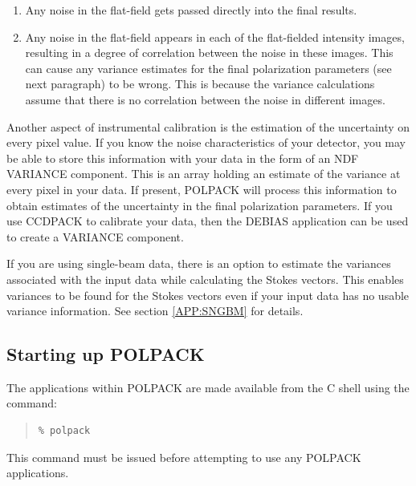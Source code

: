 \documentclass[twoside,11pt]{article}
\newcommand{\hyperref}[4]{#2\ref{#4}#3}
\newcommand{\xref}[3]{#1}
\newcommand{\xlabel}[1]{}
\renewcommand{\_}{\texttt{\symbol{95}}}
\newenvironment{myquote}{\begin{quote}\begin{small}}{\end{small}\end{quote}}
\begin{document}
\begin{enumerate}
\item Any noise in the flat-field gets passed directly into the final results.
\item Any noise in the flat-field appears in each of the flat-fielded
intensity images, resulting in a degree of correlation between the noise in 
these images. This can cause any variance estimates for the final
polarization parameters (see next paragraph) to be wrong. This is because 
the variance calculations assume that there is no correlation between the 
noise in different images. 
\end{enumerate}

Another aspect of instrumental calibration is the estimation of the
uncertainty on every pixel value. If you know the noise characteristics
of your detector, you may be able to store this information with your
data in the form of an NDF VARIANCE component. This is an array
holding an estimate of the variance at every pixel in your data. If
present, POLPACK will process this information to obtain estimates of the
uncertainty in the final polarization parameters. If you use CCDPACK to
calibrate your data, then the \xref{DEBIAS}{sun139}{DEBIAS} application
can be used to create a VARIANCE component.

If you are using single-beam data, there is an option to estimate the 
variances associated with the input data while calculating the Stokes 
vectors.
This enables variances to be found for the Stokes vectors even if your 
input data has no usable variance information. \hyperref{Go here}{See section }
{}{APP:SNGBM} for details.

\subsection{\label{SEC:START}\xlabel{startup}Starting up POLPACK}

The applications within POLPACK are made available from the C shell using the 
command:
\begin{myquote}
\begin{verbatim}
% polpack
\end{verbatim}
\end{myquote}

This command must be issued before attempting to use any POLPACK
applications. 
\end{document}
